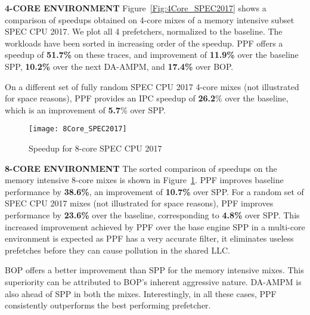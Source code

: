 \noindent \textbf{4-CORE ENVIRONMENT}
\newline
Figure~\ref{Fig:4Core_SPEC2017} shows a comparison of speedups obtained on
4-core mixes of a memory intensive subset SPEC CPU 2017. We plot all 4
prefetchers, normalized to the baseline. The workloads have been sorted in
increasing order of the speedup. PPF offers a speedup of \textbf{51.7\%} on
these traces, and improvement of \textbf{11.9\%} over the baseline SPP,
\textbf{10.2\%} over the next DA-AMPM, and \textbf{17.4\%} over BOP.

On a different set of fully random SPEC CPU 2017 4-core mixes (not illustrated
for space reasons), PPF provides an IPC speedup of \textbf{26.2}\% over the
baseline, which is an improvement of \textbf{5.7}\% over SPP.


\begin{figure}[ht]
\texttt{[image: 8Core\_SPEC2017]}
\caption{Speedup for 8-core SPEC CPU 2017}
\label{Fig:8Core_SPEC2017}
\end{figure}

\noindent \textbf{8-CORE ENVIRONMENT}
\newline
The sorted comparison of speedups on the memory intensive 8-core mixes is
shown in Figure~\ref{Fig:8Core_SPEC2017}. PPF improves baseline performance
by \textbf{38.6\%}, an improvement of \textbf{10.7\%} over SPP. For a random
set of SPEC CPU 2017 mixes (not illustrated for space reasons), PPF improves
performance by \textbf{23.6\%} over the baseline, corresponding to
\textbf{4.8\%} over SPP. This increased improvement achieved by PPF over the
base engine SPP in a multi-core environment is expected as PPF has a very
accurate filter, it eliminates useless prefetches before they can cause
pollution in the shared LLC.

BOP offers a better improvement than SPP for the memory intensive mixes. This
superiority can be attributed to BOP's inherent aggressive nature. DA-AMPM is
also ahead of SPP in both the mixes. Interestingly, in all these cases, PPF
consistently outperforms the best performing prefetcher.


